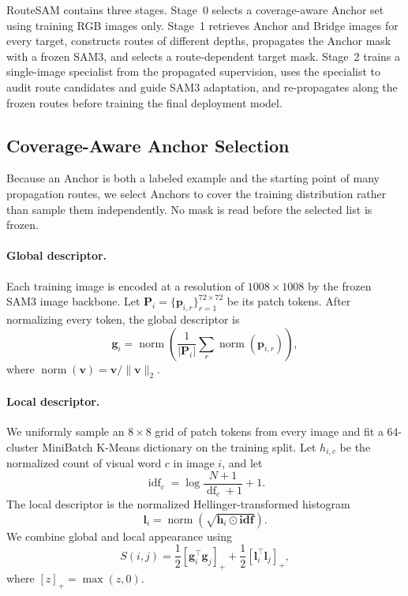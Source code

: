 \documentclass[a4paper,fleqn]{cas-dc}
\begin{document}
RouteSAM contains three stages. Stage~0 selects a coverage-aware Anchor set using training RGB images only. Stage~1 retrieves Anchor and Bridge images for every target, constructs routes of different depths, propagates the Anchor mask with a frozen SAM3, and selects a route-dependent target mask. Stage~2 trains a single-image specialist from the propagated supervision, uses the specialist to audit route candidates and guide SAM3 adaptation, and re-propagates along the frozen routes before training the final deployment model.

\subsection{Coverage-Aware Anchor Selection}\label{sec:anchor-selection}

Because an Anchor is both a labeled example and the starting point of many propagation routes, we select Anchors to cover the training distribution rather than sample them independently. No mask is read before the selected list is frozen.

\paragraph{Global descriptor.}
Each training image is encoded at a resolution of $1008 \times 1008$ by the frozen SAM3 image backbone. Let $\mathbf{P}_i=\{\mathbf{p}_{i,r}\}_{r=1}^{72\times72}$ be its patch tokens. After normalizing every token, the global descriptor is
\begin{equation}
\mathbf{g}_i=\operatorname{norm}\left(\frac{1}{|\mathbf{P}_i|}\sum_r
\operatorname{norm}(\mathbf{p}_{i,r})\right),
\end{equation}
where $\operatorname{norm}(\mathbf{v})=\mathbf{v}/\lVert\mathbf{v}\rVert_2$.

\paragraph{Local descriptor.}
We uniformly sample an $8\times8$ grid of patch tokens from every image and fit a 64-cluster MiniBatch K-Means dictionary on the training split. Let $h_{i,c}$ be the normalized count of visual word $c$ in image $i$, and let
\begin{equation}
\operatorname{idf}_c=\log\frac{N+1}{\operatorname{df}_c+1}+1.
\end{equation}
The local descriptor is the normalized Hellinger-transformed histogram
\begin{equation}
\mathbf{l}_i=\operatorname{norm}\left(\sqrt{\mathbf{h}_i\odot\mathbf{idf}}\right).
\end{equation}
We combine global and local appearance using
\begin{equation}
S(i,j)=\frac{1}{2}\left[\mathbf{g}_i^{\top}\mathbf{g}_j\right]_+
+\frac{1}{2}\left[\mathbf{l}_i^{\top}\mathbf{l}_j\right]_+,
\end{equation}
where $[z]_+=\max(z,0)$.
\end{document}
